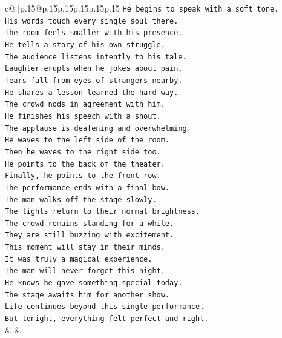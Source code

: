 \documentclass{article}
\begin{document}
{\begin{supertabular}{c@{$\;$}|p{.15\linewidth}@{}p{.15\linewidth}p{.15\linewidth}p{.15\linewidth}p{.15\linewidth}p{.15\linewidth}}
{{{\texttt{He begins to speak with a soft tone.} \\
\texttt{His words touch every single soul there.} \\
\texttt{The room feels smaller with his presence.} \\
\texttt{He tells a story of his own struggle.} \\
\texttt{The audience listens intently to his tale.} \\
\texttt{Laughter erupts when he jokes about pain.} \\
\texttt{Tears fall from eyes of strangers nearby.} \\
\texttt{He shares a lesson learned the hard way.} \\
\texttt{The crowd nods in agreement with him.} \\
\texttt{He finishes his speech with a shout.} \\
\texttt{The applause is deafening and overwhelming.} \\
\texttt{He waves to the left side of the room.} \\
\texttt{Then he waves to the right side too.} \\
\texttt{He points to the back of the theater.} \\
\texttt{Finally, he points to the front row.} \\
\texttt{The performance ends with a final bow.} \\
\texttt{The man walks off the stage slowly.} \\
\texttt{The lights return to their normal brightness.} \\
\texttt{The crowd remains standing for a while.} \\
\texttt{They are still buzzing with excitement.} \\
\texttt{This moment will stay in their minds.} \\
\texttt{It was truly a magical experience.} \\
\texttt{The man will never forget this night.} \\
\texttt{He knows he gave something special today.} \\
\texttt{The stage awaits him for another show.} \\
\texttt{Life continues beyond this single performance.} \\
\texttt{But tonight, everything felt perfect and right.} \\
            }
        }
    }
    & & \\ \\


\end{supertabular}}
\end{document}

